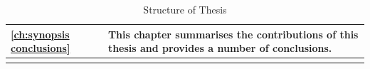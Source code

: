 \begin{center}
\begin{longtable}[l]{lp{290pt}}
   \ref{ch:synopsis conclusions}      &
    This chapter summarises the contributions of this thesis and provides a number of conclusions. \\ \bottomrule

    \caption{Structure of Thesis}\label{tab:intro structure}
\end{longtable}
\end{center}



